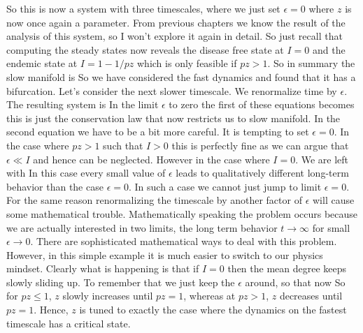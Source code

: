 \solution 
So this is now a system with three timescales, where we just set $\epsilon=0$
where $z$ is now once again a parameter. From previous chapters we know the result of the analysis of this system, so I won't explore it again in detail. So just recall that computing the steady states now reveals the disease free state at $I=0$ and the endemic state at $I=1-1/pz$ which is only feasible if $pz>1$.
So in summary the slow manifold is 
So we have considered the fast dynamics and found that it has a bifurcation. 
Let's consider the next slower timescale. We renormalize time by $\epsilon$. The resulting system is 
In the limit $\epsilon$ to zero the first of these equations becomes
this is just the conservation law that now restricts us to slow manifold. 
In the second equation we have to be a bit more careful. It is tempting to set $\epsilon=0$. In the case where $pz>1$ such that $I>0$ this is perfectly fine as we can argue that $\epsilon \ll I $ and hence can be neglected. However in the case where $I=0$. We are left with 
In this case every small value of $\epsilon$ leads to qualitatively different long-term behavior than the case $\epsilon=0$. In such a case we cannot just jump to limit $\epsilon=0$. For the same reason renormalizing the timescale by another factor of $\epsilon$ will cause some mathematical trouble.  Mathematically speaking the problem occurs because we are actually interested in two limits, the long term behavior $t \to \infty$ for small $\epsilon \to 0$. There are sophisticated mathematical ways to deal with this problem. However, in this simple example it is much easier to switch to our physics mindset. Clearly what is happening is that if $I=0$ then the mean degree keeps slowly sliding up. To remember that we just keep the $\epsilon$ around, so that now
So for $pz \leq 1$, $z$ slowly increases until $pz=1$, whereas at $pz>1$, $z$ decreases until $pz=1$. Hence, $z$ is tuned to exactly the case where the dynamics on the fastest timescale has a critical state.

